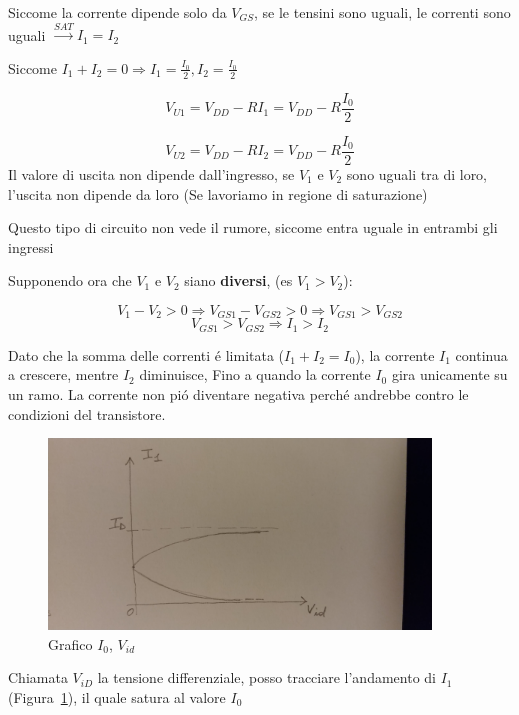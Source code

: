 \documentclass{article}
\begin{document}
Siccome la corrente dipende solo da $V_{GS}$, se le tensini sono uguali, le correnti sono uguali $\xrightarrow{SAT} I_1 = I_2$

Siccome $I_1 + I_2 = 0 \Rightarrow I_1 = \frac{I_0}{2} , I_2 = \frac{I_0}{2}$

\[
    V_{U1} = V_{DD} - RI_1 = V_{DD} - R\frac{I_0 }{2}
\]

\[
    V_{U2} = V_{DD} - RI_2 = V_{DD} - R\frac{I_0 }{2}
\]
Il valore di uscita non dipende dall'ingresso, se $V_1$ e $V_2$ sono uguali tra di loro, l'uscita non dipende da loro (Se lavoriamo in regione di saturazione)

Questo tipo di circuito non vede il rumore, siccome entra uguale in entrambi gli ingressi

\vspace{20px}
Supponendo ora che $V_1$ e $V_2$ siano \textbf{diversi}, (es $V_1 > V_2$):

\[
    V_1 - V_2 > 0 \Rightarrow V_{GS1} - V_{GS2} > 0 \Rightarrow V_{GS1} > V_{GS2}
\]
\[
    V_{GS1} > V_{GS2} \Rightarrow I_1 > I_2
\]

Dato che la somma delle correnti \'e limitata ($I_1 + I_2 = I_0$), la corrente $I_1$ continua a crescere, mentre $I_2$ diminuisce, Fino a quando la corrente $I_0$ gira unicamente su un ramo. La corrente non pi\'o diventare negativa perch\'e andrebbe contro le condizioni del transistore.

\begin{figure}[ht]
    \centering
    \includegraphics[width=4in]{img/elettronica/grafico2.jpg}
    \caption{Grafico $I_0$, $V_{id}$\label{grafico_analog}}
\end{figure}

Chiamata $V_{iD}$ la tensione differenziale, posso tracciare l'andamento di $I_1$ (Figura~\ref{grafico_analog}), il quale satura al valore $I_0$
\end{document}
